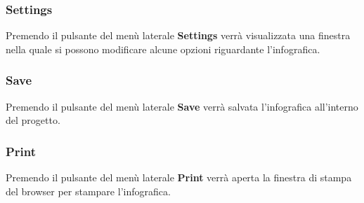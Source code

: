\subsubsection{Settings}
Premendo il pulsante del menù laterale \textbf{Settings} verrà visualizzata una finestra nella quale si possono modificare alcune opzioni riguardante l'infografica.
\subsubsection{Save}
Premendo il pulsante del menù laterale \textbf{Save} verrà salvata l'infografica all'interno del progetto.
\subsubsection{Print}
Premendo il pulsante del menù laterale \textbf{Print} verrà aperta la finestra di stampa del browser per stampare l'infografica.

